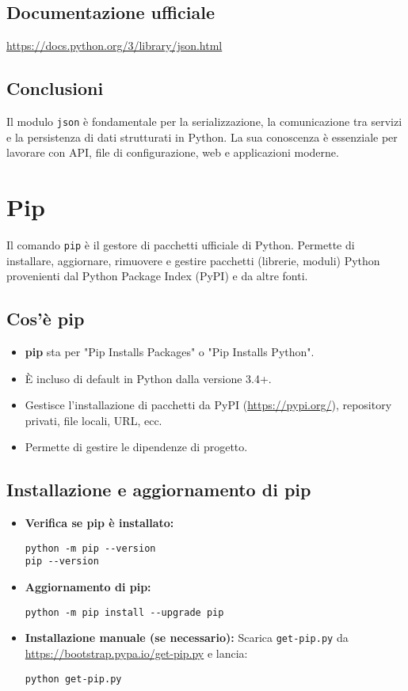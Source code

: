 \documentclass[a4paper,12pt]{article}
\begin{document}
\subsection*{Documentazione ufficiale}
\url{https://docs.python.org/3/library/json.html}

\subsection*{Conclusioni}
Il modulo \texttt{json} è fondamentale per la serializzazione, la comunicazione tra servizi e la persistenza di dati strutturati in Python. La sua conoscenza è essenziale per lavorare con API, file di configurazione, web e applicazioni moderne.

\section{Pip}
Il comando \texttt{pip} è il gestore di pacchetti ufficiale di Python. Permette di installare, aggiornare, rimuovere e gestire pacchetti (librerie, moduli) Python provenienti dal Python Package Index (PyPI) e da altre fonti.

\subsection*{Cos'è pip}
\begin{itemize}
    \item \textbf{pip} sta per "Pip Installs Packages" o "Pip Installs Python".
    \item È incluso di default in Python dalla versione 3.4+.
    \item Gestisce l'installazione di pacchetti da PyPI (\url{https://pypi.org/}), repository privati, file locali, URL, ecc.
    \item Permette di gestire le dipendenze di progetto.
\end{itemize}

\subsection*{Installazione e aggiornamento di pip}
\begin{itemize}
    \item \textbf{Verifica se pip è installato:}
    \begin{lstlisting}
python -m pip --version
pip --version
    \end{lstlisting}
    \item \textbf{Aggiornamento di pip:}
    \begin{lstlisting}
python -m pip install --upgrade pip
    \end{lstlisting}
    \item \textbf{Installazione manuale (se necessario):}
    Scarica \texttt{get-pip.py} da \url{https://bootstrap.pypa.io/get-pip.py} e lancia:
    \begin{lstlisting}
python get-pip.py
    \end{lstlisting}
\end{itemize}
\end{document}

